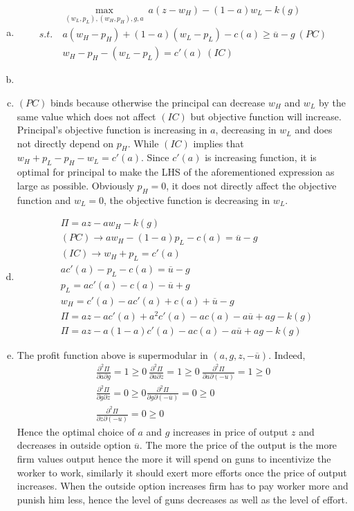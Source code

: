 \documentclass[a4paper]{article}
\newcommand{\ubar}{\overline}
\begin{document}
\begin{enumerate}[(a)]
	\item \begin{align*}
	&\underset{(w_L, p_L), (w_H, p_H), g, a}{\max}\ a(z - w_H) - (1 - a) w_L - k(g)\\
	s.t.\ &a(w_H - p_H) + (1 - a)(w_L - p_L) - c(a) \ge \ubar{u} - g\ (PC)\\
	&w_H - p_H - (w_L - p_L) = c'(a)\ (IC)
	\end{align*}
	\item 
	\item $(PC)$ binds because otherwise the principal can decrease $w_H$ and $w_L$ by the same value which does not affect $(IC)$ but objective function will increase. Principal's objective function is increasing in $a$, decreasing in $w_L$ and does not directly depend on $p_H$. While $(IC)$ implies that
	$w_H + p_L - p_H - w_L = c'(a)$. Since $c'(a)$ is increasing function, it is optimal for principal to make the LHS of the aforementioned expression as large as possible. Obviously $p_H = 0$, it does not directly affect the objective function and $w_L = 0$, the objective function is decreasing in $w_L$.
	\item \begin{align*}
	&\Pi = az - aw_H - k(g)\\
	&(PC) \to aw_H - (1 - a)p_L - c(a) = \ubar{u} - g\\
	&(IC) \to w_H + p_L = c'(a)\\
	&ac'(a) - p_L - c(a) = \ubar{u} - g\\
	&p_L = ac'(a) - c(a) - \ubar{u} + g\\
	&w_H = c'(a) - ac'(a) + c(a) + \ubar{u} - g\\
	&\Pi = az - ac'(a) + a^2c'(a) - ac(a) - a\ubar{u} + ag - k(g)\\
	&\Pi = az -a(1 - a)c'(a) - ac(a) - a\ubar{u} + ag - k(g)
	\end{align*}
	\item The profit function above is supermodular in $(a, g, z, -\ubar{u})$. Indeed,
	\begin{align*}
	\frac{\partial^2 \Pi}{\partial a \partial g} = 1 \ge 0\ \frac{\partial^2 \Pi}{\partial a \partial z} = 1 \ge 0\  
	\frac{\partial^2 \Pi}{\partial a \partial( -\ubar{u})} = 1 \ge 0\\
	\frac{\partial^2 \Pi}{\partial g \partial z} = 0 \ge 0 
	\frac{\partial^2 \Pi}{\partial g \partial (-\ubar{u})} = 0 \ge 0   \\
	\frac{\partial^2 \Pi}{\partial z \partial(-\ubar{u})} = 0 \ge 0
	\end{align*}
	Hence the optimal choice of $a$ and $g$ increases in price of output $z$ and decreases in outside option $\ubar{u}$. The more the price of the output is the more firm values output hence the more it will spend on guns to incentivize the worker to work, similarly it should exert more efforts once the price of output increases. When the outside option increases firm has to pay worker more and punish him less, hence the level of guns decreases as well as the level of effort.
\end{enumerate}
\end{document}
